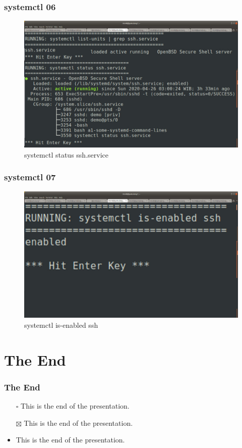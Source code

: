 \documentclass[xcolor=table, notheorems, hyperref={pdfpagelabels=false}]{beamer}
\begin{document}
\begin{frame}[fragile]
\frametitle{systemctl 06}
\begin{figure}
\includegraphics[width=.93\linewidth]{os-systemd05.jpg}
\caption{systemctl status ssh.service}
\end{figure}
\end{frame}

\begin{frame}[fragile]
\frametitle{systemctl 07}
\begin{figure}
\includegraphics[width=.93\linewidth]{os-systemd06.jpg}
\caption{systemctl is-enabled ssh}
\end{figure}
\end{frame}




\section{The End}
\begin{frame}
\frametitle{The End}
\begin{itemize}
\item[$\square$] This is the end of the presentation.
\item[$\boxtimes$] This is the end of the presentation.
\item This is the end of the presentation.
\end{itemize}
\end{frame}

\end{document}
